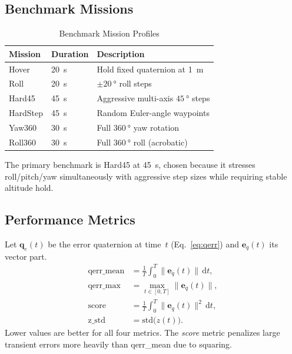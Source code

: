 \documentclass[conference]{IEEEtran}
\begin{document}
\subsection{Benchmark Missions}

\begin{table}[t]
  \centering
  \caption{Benchmark Mission Profiles}
  \label{tab:missions}
  \begin{tabular}{lll}
    \toprule
    Mission & Duration & Description \\
    \midrule
    Hover     & \SI{20}{\second}   & Hold fixed quaternion at \SI{1}{\meter} \\
    Roll      & \SI{20}{\second}   & $\pm\SI{20}{\degree}$ roll steps \\
    Hard45    & \SI{45}{\second}   & Aggressive multi-axis $\SI{45}{\degree}$ steps \\
    HardStep  & \SI{45}{\second}   & Random Euler-angle waypoints \\
    Yaw360    & \SI{30}{\second}   & Full $\SI{360}{\degree}$ yaw rotation \\
    Roll360   & \SI{30}{\second}   & Full $\SI{360}{\degree}$ roll (acrobatic) \\
    \bottomrule
  \end{tabular}
\end{table}

The primary benchmark is Hard45 at \SI{45}{\second}, chosen because it
stresses roll/pitch/yaw simultaneously with aggressive step sizes while
requiring stable altitude hold.

\subsection{Performance Metrics}

Let $\mathbf{q}_e(t)$ be the error quaternion at time~$t$ (Eq.~\eqref{eq:qerr})
and $\mathbf{e}_q(t)$ its vector part.
\begin{align}
  \text{qerr\_mean} &= \frac{1}{T}\int_0^T \|\mathbf{e}_q(t)\|\,\mathrm{d}t,
    \label{eq:qerr_mean}\\
  \text{qerr\_max}  &= \max_{t\in[0,T]} \|\mathbf{e}_q(t)\|,
    \label{eq:qerr_max}\\
  \text{score}      &= \frac{1}{T}\int_0^T \|\mathbf{e}_q(t)\|^2\,\mathrm{d}t,
    \label{eq:score}\\
  \text{z\_std}     &= \mathrm{std}\bigl(z(t)\bigr).
    \label{eq:zstd}
\end{align}
Lower values are better for all four metrics.
The \textit{score} metric penalizes large transient errors more heavily than
qerr\_mean due to squaring.
\end{document}
